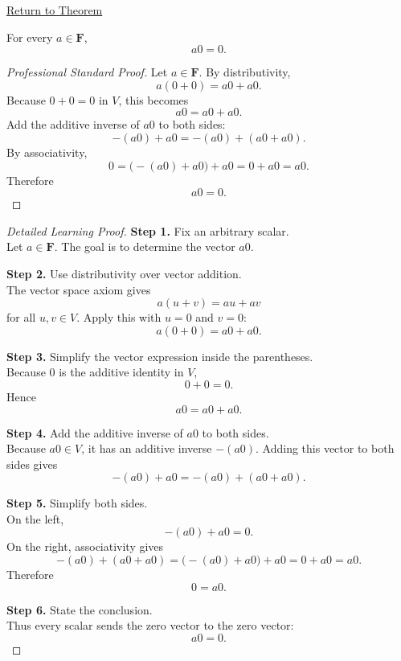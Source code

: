 
\newpage
{}
\label{prf:scalar-times-zero-vector}

\begin{remark*}[Return]
\hyperref[thm:scalar-times-zero-vector]{Return to Theorem}
\end{remark*}

\begin{theorem*}[$a0=0$]
For every $a \in \mathbf{F}$,
\[
a0=0.
\]
\end{theorem*}

\begin{proof}[Professional Standard Proof]
\LRAProofBodyStart
Let $a \in \mathbf{F}$. By distributivity,
\[
a(0+0)=a0+a0.
\]
Because $0+0=0$ in $V$, this becomes
\[
a0=a0+a0.
\]
Add the additive inverse of $a0$ to both sides:
\[
-(a0)+a0=-(a0)+(a0+a0).
\]
By associativity,
\[
0=\bigl(-(a0)+a0\bigr)+a0=0+a0=a0.
\]
Therefore
\[
a0=0.
\]
\end{proof}

\begin{proof}[Detailed Learning Proof]
\LRAProofBodyStart

\textbf{Step 1.} Fix an arbitrary scalar.\\
Let $a \in \mathbf{F}$. The goal is to determine the vector $a0$.

\textbf{Step 2.} Use distributivity over vector addition.\\
The vector space axiom gives
\[
a(u+v)=au+av
\]
for all $u,v \in V$. Apply this with $u=0$ and $v=0$:
\[
a(0+0)=a0+a0.
\]

\textbf{Step 3.} Simplify the vector expression inside the parentheses.\\
Because $0$ is the additive identity in $V$,
\[
0+0=0.
\]
Hence
\[
a0=a0+a0.
\]

\textbf{Step 4.} Add the additive inverse of $a0$ to both sides.\\
Because $a0 \in V$, it has an additive inverse $-(a0)$. Adding this vector to both sides gives
\[
-(a0)+a0=-(a0)+(a0+a0).
\]

\textbf{Step 5.} Simplify both sides.\\
On the left,
\[
-(a0)+a0=0.
\]
On the right, associativity gives
\[
-(a0)+(a0+a0)=\bigl(-(a0)+a0\bigr)+a0=0+a0=a0.
\]
Therefore
\[
0=a0.
\]

\textbf{Step 6.} State the conclusion.\\
Thus every scalar sends the zero vector to the zero vector:
\[
a0=0.
\]
\end{proof}


